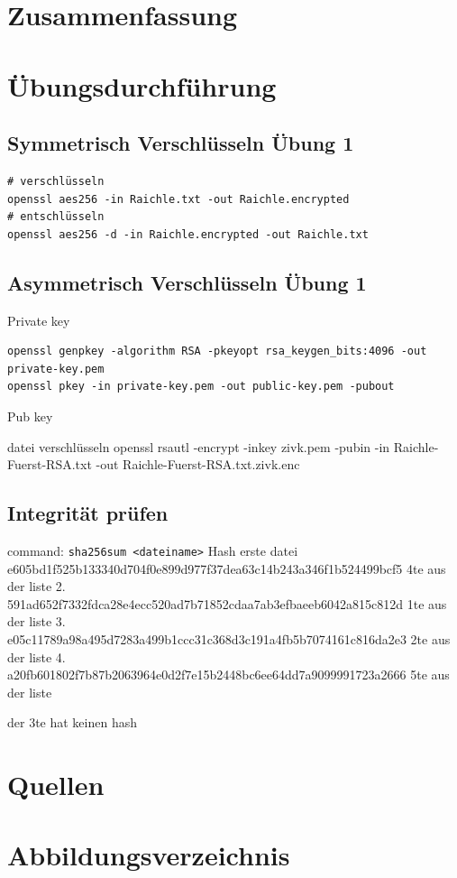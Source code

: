 \documentclass[a4paper]{article}
\begin{document}
\section{Zusammenfassung}


\newpage

\section{Übungsdurchführung}

\subsection{Symmetrisch Verschlüsseln Übung 1}
\begin{lstlisting}
# verschlüsseln
openssl aes256 -in Raichle.txt -out Raichle.encrypted
# entschlüsseln
openssl aes256 -d -in Raichle.encrypted -out Raichle.txt
\end{lstlisting}

\subsection{Asymmetrisch Verschlüsseln Übung 1}
Private key
\begin{lstlisting}
openssl genpkey -algorithm RSA -pkeyopt rsa_keygen_bits:4096 -out private-key.pem
openssl pkey -in private-key.pem -out public-key.pem -pubout
\end{lstlisting}
Pub key

datei verschlüsseln
openssl rsautl -encrypt -inkey zivk.pem -pubin -in Raichle-Fuerst-RSA.txt -out Raichle-Fuerst-RSA.txt.zivk.enc
\subsection{Integrität prüfen}
command:
\texttt{sha256sum <dateiname>}
Hash erste datei
e605bd1f525b133340d704f0e899d977f37dea63c14b243a346f1b524499bcf5
4te aus der liste
2.
591ad652f7332fdca28e4ecc520ad7b71852cdaa7ab3efbaeeb6042a815c812d
1te aus der liste
3.
e05c11789a98a495d7283a499b1ccc31c368d3c191a4fb5b7074161c816da2e3
2te aus der liste
4.
a20fb601802f7b87b2063964e0d2f7e15b2448bc6ee64dd7a9099991723a2666
5te aus der liste

der 3te hat keinen hash



\newpage
\section{Quellen}

\newpage
\section{Abbildungsverzeichnis}

\listoffigures
\end{document}
